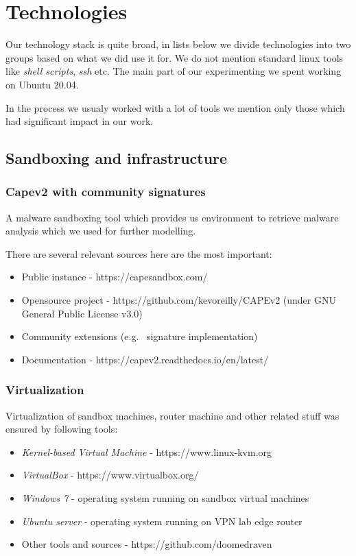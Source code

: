 \chapter{Technologies} \label{app:technologies}
Our technology stack is quite broad, in lists below we divide technologies into two groups based on what we did use it for. We do not mention standard linux tools like \emph{shell scripts}, \emph{ssh} etc. The main part of our experimenting we spent working on Ubuntu 20.04.

In the process we usualy worked with a lot of tools we mention only those which had significant impact in our work.


\section*{Sandboxing and infrastructure}
\subsection*{Capev2 with community signatures}
A malware sandboxing tool which provides us environment to retrieve malware analysis which we used for further modelling. 

There are several relevant sources here are the most important:
\begin{itemize}
  \itemsep0em 
  \item Public instance - https://capesandbox.com/
  \item Opensource project -  https://github.com/kevoreilly/CAPEv2 (under GNU General Public License v3.0)
  \item Community extensions (e.g. \ signature implementation)
  \item Documentation - https://capev2.readthedocs.io/en/latest/
\end{itemize}

\subsection*{Virtualization}
Virtualization of sandbox machines, router machine and other related stuff was ensured by following tools:
\begin{itemize}
  \itemsep0em 
  \item \emph{Kernel-based Virtual Machine} - https://www.linux-kvm.org
  \item \emph{VirtualBox} - https://www.virtualbox.org/
  \item \emph{Windows 7} - operating system running on sandbox virtual machines
  \item \emph{Ubuntu server} - operating system running on VPN lab edge router
  \item Other tools and sources - https://github.com/doomedraven
\end{itemize}

